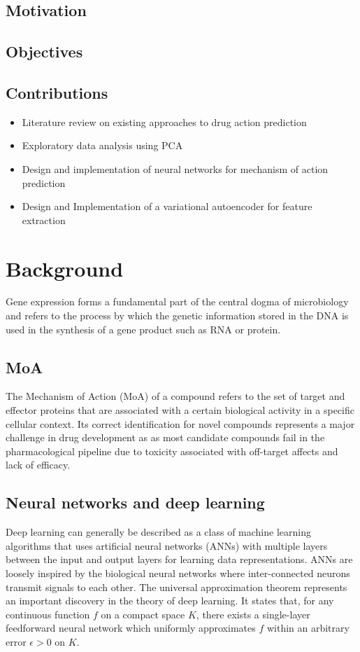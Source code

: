 \documentclass[bsc,frontabs,twoside,singlespacing,parskip,deptreport]{infthesis}     %
\begin{document}
\section{Motivation}
\section{Objectives}
\section{Contributions}
\begin{itemize}
\item Literature review on existing approaches to drug action prediction 
\item Exploratory data analysis using PCA
\item Design and implementation of neural networks for mechanism of action prediction
\item Design and Implementation of a variational autoencoder for feature extraction

\end{itemize}



\chapter{Background}

Gene expression forms a fundamental part of the central dogma of microbiology \cite{crick_protein_1958} and refers to the process by which the genetic information stored in the DNA is used in the synthesis of a gene product such as RNA or protein. 
\section{MoA}
The Mechanism of Action (MoA) of a compound refers to the set of target and effector proteins that are associated with a certain biological activity in a specific cellular context. Its correct identification for novel compounds represents a major challenge in drug development as as most candidate compounds fail in the pharmacological pipeline due to toxicity associated with off-target affects and lack of efficacy\cite{wehling_assessing_2009}.
\section{Neural networks and deep learning}
Deep learning can generally be described as a class of machine learning algorithms that uses artificial neural networks (ANNs) with multiple layers between the input and output layers for learning data representations. ANNs are loosely inspired by the biological neural networks where inter-connected neurons transmit signals to each other.
The universal approximation theorem represents an important discovery in the theory of deep learning. It states that, for any continuous function \(f\) on a compact space \(K\), there exists a single-layer feedforward neural network which uniformly approximates \(f\) within an arbitrary error \(\epsilon>0\) on \(K\).
\end{document}
